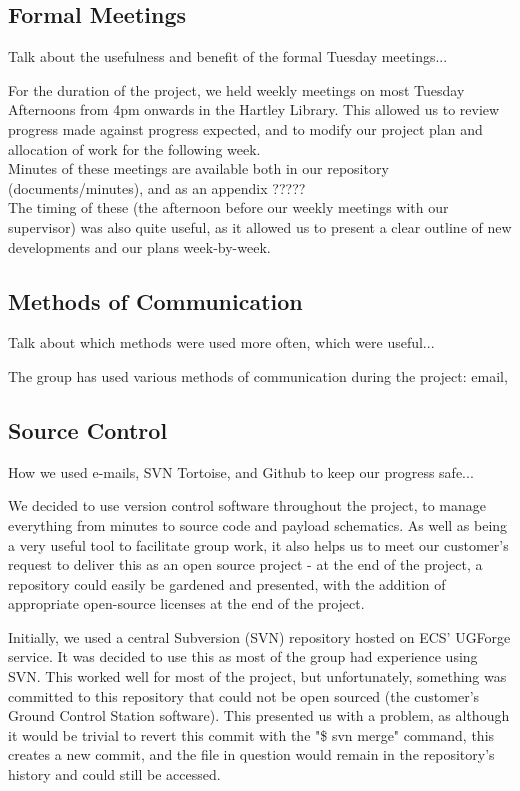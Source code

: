 \subsection{Formal Meetings}
Talk about the usefulness and benefit of the formal Tuesday meetings...

For the duration of the project, we held weekly meetings on most Tuesday 
Afternoons from 4pm onwards in the Hartley Library. This allowed us to 
review progress made against progress expected, and to modify our project 
plan and allocation of work for the following week.
\\
Minutes of these meetings are available both in our repository \cite{github} 
(documents/minutes), and as an appendix ?????
\\
The timing of these (the afternoon before our weekly meetings with our 
supervisor) was also quite useful, as it allowed us to present a clear outline 
of new developments and our plans week-by-week.

\subsection{Methods of Communication}
Talk about which methods were used more often, which were useful...

The group has used various methods of communication during the project: 
email, 

\subsection{Source Control}
How we used e-mails, SVN Tortoise, and Github to keep our progress safe...

We decided to use version control software throughout the project, to manage 
everything from minutes to source code and payload schematics. As well as 
being a very useful tool to facilitate group work, it also helps us to meet 
our customer's request to deliver this as an open source project - at the end 
of the project, a repository could easily be gardened and presented, with the 
addition of appropriate open-source licenses at the end of the project.

Initially, we used a central Subversion (SVN) repository hosted on ECS' 
UGForge service. It was decided to use this as most of the group had 
experience using SVN. This worked well for most of the project, but 
unfortunately, something was committed to this repository that could not be 
open sourced (the customer's Ground Control Station software). This presented 
us with a problem, as although it would be trivial to revert this commit with 
the "\$ svn merge" command, this creates a new commit, and the file in 
question would remain in the repository's history and could still be accessed.

